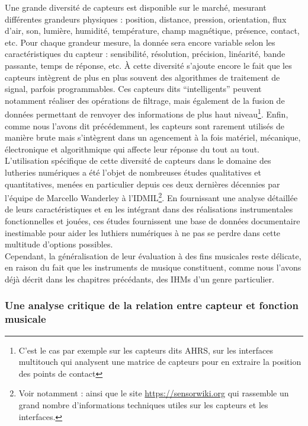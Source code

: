 \noindent Une grande diversité de capteurs est disponible sur le marché, mesurant différentes grandeurs physiques : position, distance, pression, orientation, flux d'air, son, lumière, humidité, température, champ magnétique, présence, contact, etc. Pour chaque grandeur mesure, la donnée sera encore variable selon les caractéristiques du capteur : sensibilité, résolution, précision, linéarité, bande passante, temps de réponse, etc. À cette diversité s'ajoute encore le fait que les capteurs intègrent de plus en plus souvent des algorithmes de traitement de signal, parfois programmables. Ces capteurs dits ``intelligents'' peuvent notamment réaliser des opérations de filtrage, mais également de la fusion de données permettant de renvoyer des informations de plus haut niveau\footnote{C'est le cas par exemple sur les capteurs dits \gls{AHRS}, sur les interfaces multitouch qui analysent une matrice de capteurs pour en extraire la position des points de contact}. Enfin, comme nous l'avons dit précédemment, les capteurs sont rarement utilisés de manière brute mais s'intègrent dans un agencement à la fois matériel, mécanique, électronique et algorithmique qui affecte leur réponse du tout au tout.\\
\indent L'utilisation spécifique de cette diversité de capteurs dans le domaine des lutheries numériques a été l'objet de nombreuses études qualitatives et quantitatives, menées en particulier depuis ces deux dernières décennies par l'équipe de Marcello Wanderley à l'\gls{IDMIL}\footnote{Voir notamment : \cite{wanderley_choice_2000, hollinger_evaluation_2006, marshall_sensor_2009, vigliensoni_quantitative_2012, medeiros_comprehensive_2014} ainsi que le site \url{https://sensorwiki.org} qui rassemble un grand nombre d'informations techniques utiles sur les capteurs et les interfaces.}. En fournissant une analyse détaillée de leurs caractéristiques et en les intégrant dans des réalisations instrumentales fonctionnelles et jouées, ces études fournissent une base de données documentaire inestimable pour aider les luthiers numériques à ne pas se perdre dans cette multitude d'options possibles.\\
\indent Cependant, la généralisation de leur évaluation à des fins musicales reste délicate, en raison du fait que les instruments de musique constituent, comme nous l'avons déjà décrit dans les chapitres précédants, des \glspl{IHM} d'un genre particulier.

\subsubsection{Une analyse critique de la relation entre capteur et fonction musicale}

